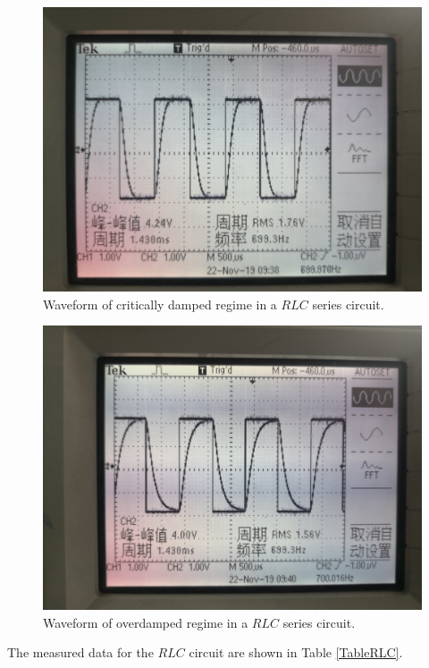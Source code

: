 \documentclass{article}
\begin{document}
\begin{figure}[H]\centering
    \includegraphics[scale=0.06]{4.jpg}
    \caption{Waveform of critically damped regime in a $RLC$ series circuit.}
\end{figure}

\begin{figure}[H]\centering
    \includegraphics[scale=0.06]{5.jpg}
    \caption{Waveform of overdamped regime in a $RLC$ series circuit.}\label{FigOverdamp}
\end{figure}

The measured data for the $RLC$ circuit are shown in Table \ref{TableRLC}.
\end{document}
